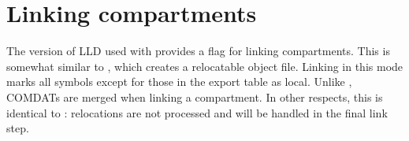 \section{Linking compartments}

The version of LLD used with \cherimcu{} provides a  flag for linking compartments.
This is somewhat similar to , which creates a relocatable object file.
Linking in this mode marks all symbols except for those in the export table as local.
Unlike , COMDATs are merged when linking a compartment.
In other respects, this is identical to : relocations are not processed and will be handled in the final link step.
